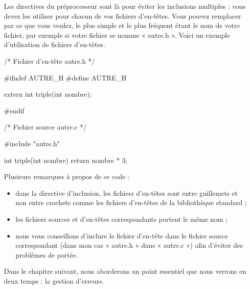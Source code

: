 Les directives du préprocesseur sont là pour éviter les inclusions
multiples : vous devez les utiliser pour chacun de vos fichiers
d'en-têtes. Vous pouvez remplacer  par ce que vous
voulez, le plus simple et le plus fréquent étant le nom de votre
fichier, par exemple  si votre fichier se nomme «
autre.h ». Voici un exemple d'utilisation de fichiers d'en-têtes.

\begin{C}
/* Fichier d'en-tête autre.h */

#ifndef AUTRE_H
#define AUTRE_H

extern int triple(int nombre);

#endif
\end{C}

\begin{C}
/* Fichier source autre.c */

#include "autre.h"

int triple(int nombre)
{
    return nombre * 3;
}
\end{C}

\begin{C}
/* Fichier source main.c */

#include "autre.h"

int main(void)
{
    int nombre = triple(3);
    return 0;

\end{C}

Plusieurs remarques à propos de ce code :

\begin{itemize}
\item
  dans la directive d'inclusion, les fichiers d'en-têtes sont entre
  guillemets et non entre crochets comme les fichiers d'en-têtes de la
  bibliothèque standard ;
\item
  les fichiers sources et d'en-têtes correspondants portent le même nom
  ;
\item
  nous vous conseillons d'inclure le fichier d'en-tête dans le fichier
  source correspondant (dans mon cas « autre.h » dans « autre.c ») afin
  d'éviter des problèmes de portée.
\end{itemize}

\hrulefill

Dans le chapitre suivant, nous aborderons un point essentiel que
nous verrons en deux temps : la gestion d'erreurs.
